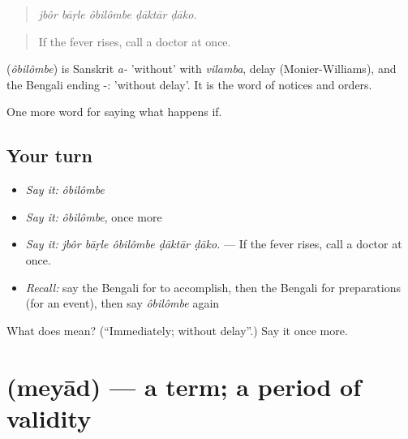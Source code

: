 \begin{quote}
    
\end{quote}

\begin{quote}
\emph{jbôr bāṛle ôbilômbe ḍāktār ḍāko.}
\end{quote}

\begin{quote}
If the fever rises, call a doctor at once.
\end{quote}

\begin{cousinweb}
\textbf{} (\emph{ôbilômbe}) is Sanskrit \emph{a-} 'without' with \emph{vilamba}, delay (Monier-Williams), and the Bengali ending -: 'without delay'. It is the word of notices and orders.
\end{cousinweb}

\begin{grammarlens}[title={What you've built}]
One more word for saying what happens if.
\end{grammarlens}

\subsection*{Your turn}
\begin{itemize}
\raggedright
  \item \emph{Say it:} \emph{ôbilômbe}
  \item \emph{Say it:} \emph{ôbilômbe}, once more
  \item \emph{Say it:} \emph{jbôr bāṛle ôbilômbe ḍāktār ḍāko.} — If the fever rises, call a doctor at once.
  \item \emph{Recall:} say the Bengali for to accomplish, then the Bengali for preparations (for an event), then say \emph{ôbilômbe} again
\end{itemize}

\begin{tcolorbox}[breakable,colback=teal!4,colframe=teal!35!black,title={Before you move on}]
What does  mean? (\textquotedblleft{}Immediately; without delay\textquotedblright{}.) Say it once more.
\end{tcolorbox}
\section[\texorpdfstring{\bn{মেয়াদ} (meyād)}{মেয়াদ (meyād)}]{ (meyād) — a term; a period of validity}


